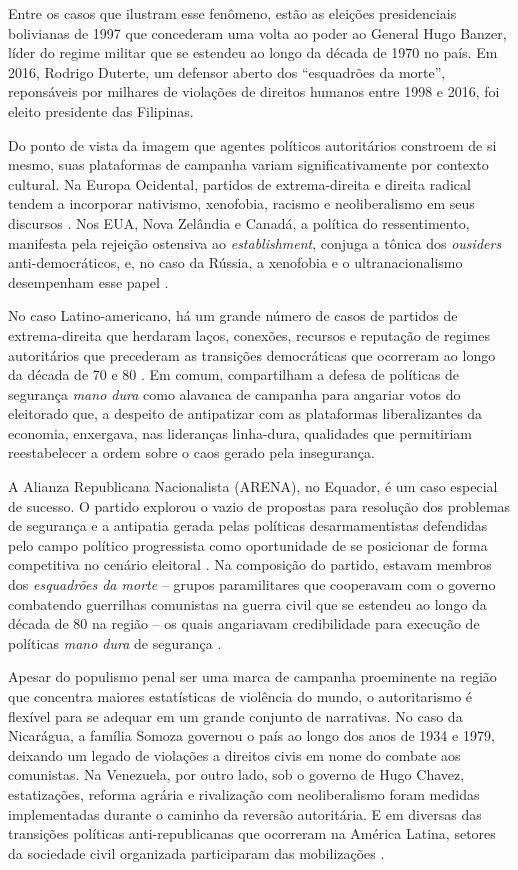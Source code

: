 \documentclass[
12pt,				%
openright,			%
twoside,			%
a4paper,			%
english,			%
french,				%
spanish,			%
brazil				%
]{abntex2}
\begin{document}
Entre os casos que ilustram esse fenômeno, estão as eleições presidenciais bolivianas de 1997 que concederam uma volta ao poder ao General Hugo Banzer, líder do regime militar que se estendeu ao longo da década de 1970 no país. Em 2016, Rodrigo Duterte, um defensor aberto dos ``esquadrões da morte'', reponsáveis por milhares de violações de direitos humanos entre 1998 e 2016, foi eleito presidente das Filipinas. 

Do ponto de vista da imagem que agentes políticos autoritários constroem de si mesmo, suas plataformas de campanha variam significativamente por contexto cultural. Na Europa Ocidental, partidos de extrema-direita e direita radical tendem a incorporar nativismo, xenofobia, racismo e neoliberalismo em seus discursos \cite{mudde2009populist}. Nos EUA, Nova Zelândia e Canadá, a política do ressentimento, manifesta pela rejeição ostensiva ao \emph{establishment}, conjuga a tônica dos \emph{ousiders} anti-democráticos, e, no caso da Rússia, a xenofobia e o ultranacionalismo desempenham esse papel \cite{norris2005radical}. 

No caso Latino-americano, há um grande número de casos de partidos de extrema-direita que herdaram laços, conexões, recursos e reputação de regimes autoritários que precederam as transições democráticas que ocorreram ao longo da década de 70 e 80 \cite{loxton2014authoritarian}. Em comum, compartilham a defesa de políticas de segurança \emph{mano dura} como alavanca de campanha para angariar votos do eleitorado que, a despeito de antipatizar com as plataformas liberalizantes da economia, enxergava, nas lideranças linha-dura, qualidades que permitiriam reestabelecer a ordem sobre o caos gerado pela insegurança.

A Alianza Republicana Nacionalista (ARENA), no Equador, é um caso especial de sucesso. O partido explorou o vazio de propostas para resolução dos problemas de segurança e a antipatia gerada pelas políticas desarmamentistas defendidas pelo campo político progressista como oportunidade de se posicionar de forma competitiva no cenário eleitoral \cite{holland2013right}. Na composição do partido, estavam membros dos \emph{esquadrões da morte} -- grupos paramilitares que cooperavam com o governo combatendo guerrilhas comunistas na guerra civil que se estendeu ao longo da década de 80 na região -- os quais angariavam credibilidade para execução de políticas \emph{mano dura} de segurança \cite{loxton2014authoritarian}.

Apesar do populismo penal ser uma marca de campanha proeminente na região que concentra maiores estatísticas de violência do mundo, o autoritarismo é flexível para se adequar em um grande conjunto de narrativas. No caso da Nicarágua, a família Somoza governou o país ao longo dos anos de 1934 e 1979, deixando um legado de violações a direitos civis em nome do combate aos comunistas. Na Venezuela, por outro lado, sob o governo de Hugo Chavez, estatizações, reforma agrária e rivalização com neoliberalismo foram medidas implementadas durante o caminho da reversão autoritária. E em diversas das transições políticas anti-republicanas que ocorreram na América Latina, setores da sociedade civil organizada participaram das mobilizações \cite{valenzuela2004latin}.
\end{document}
